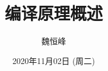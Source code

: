 \documentclass[]{beamer}
\title[编译原理概述]{编译原理概述}
\author[魏恒峰]{\large 魏恒峰}
\institute{hfwei@nju.edu.cn}
\date{2020年11月02日 (周二)}
\begin{document}
\maketitle



\thankyou{}

\end{document}
